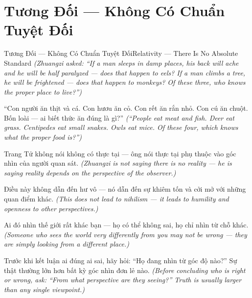 \section{Tương Đối — Không Có Chuẩn Tuyệt Đối}
\begin{truyen}{Tương Đối — Không Có Chuẩn Tuyệt Đối}{Relativity — There Is No Absolute Standard}
\textit{(Zhuangzi asked: ``If a man sleeps in damp places, his back will ache and he will be half paralyzed — does that happen to eels? If a man climbs a tree, he will be frightened — does that happen to monkeys? Of these three, who knows the proper place to live?'')}

``Con người ăn thịt và cá. Con hươu ăn cỏ. Con rết ăn rắn nhỏ. Con cú ăn chuột. Bốn loài — ai biết thức ăn đúng là gì?''
\textit{(``People eat meat and fish. Deer eat grass. Centipedes eat small snakes. Owls eat mice. Of these four, which knows what the proper food is?'')}

Trang Tử không nói không có thực tại — ông nói thực tại phụ thuộc vào góc nhìn của người quan sát.
\textit{(Zhuangzi is not saying there is no reality — he is saying reality depends on the perspective of the observer.)}

Điều này không dẫn đến hư vô — nó dẫn đến sự khiêm tốn và cởi mở với những quan điểm khác.
\textit{(This does not lead to nihilism — it leads to humility and openness to other perspectives.)}

Ai đó nhìn thế giới rất khác bạn — họ có thể không sai, họ chỉ nhìn từ chỗ khác.
\textit{(Someone who sees the world very differently from you may not be wrong — they are simply looking from a different place.)}

\end{truyen}

\begin{baihoc}
Trước khi kết luận ai đúng ai sai, hãy hỏi: ``Họ đang nhìn từ góc độ nào?'' Sự thật thường lớn hơn bất kỳ góc nhìn đơn lẻ nào.
\textit{(Before concluding who is right or wrong, ask: ``From what perspective are they seeing?'' Truth is usually larger than any single viewpoint.)}
\end{baihoc}
\ngancach


